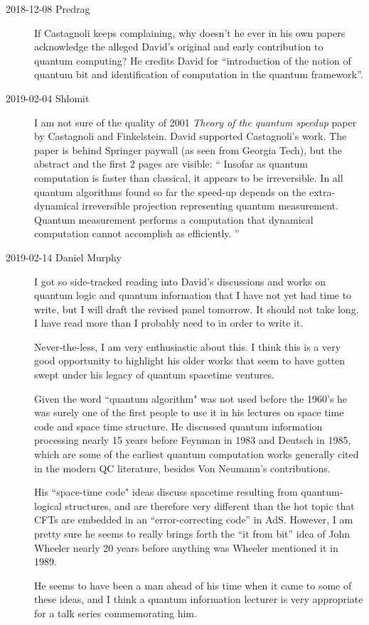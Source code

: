 \begin{description}
\item[2018-12-08 Predrag]
If Castagnoli keeps complaining, why doesn't he ever in his own papers
acknowledge the alleged David's original and early contribution to quantum
computing?
He credits David for ``introduction of the notion of
quantum bit and identification of computation in the quantum
framework''.

\item[2019-02-04 Shlomit]
I am not sure of the quality of 2001 {\em  Theory of the quantum speedup}
paper by Castagnoli and Finkelstein.
David supported Castagnoli's work. %
The paper is behind Springer paywall (as seen from Georgia Tech), but the
abstract and the first 2 pages are visible: ``
Insofar as quantum computation is faster than classical, it appears to be
irreversible. In all quantum algorithms found so far the speed-up depends
on the extra-dynamical irreversible projection representing quantum
measurement. Quantum measurement performs a computation that dynamical
computation cannot accomplish as efficiently.
''

\item[2019-02-14 Daniel Murphy]
I got so side-tracked reading into David's discussions and works on
quantum logic and quantum information that I have not yet had time to
write, but I will draft the revised panel tomorrow. It should not take
long. I have read more than I probably need to in order to write it.

Never-the-less, I am very enthusiastic about this. I think this is a very
good opportunity to highlight his older works that seem to have gotten
swept under his legacy of quantum spacetime ventures.

Given the word ``quantum algorithm" was not used before the 1960's he was
surely one of the first people to use it in his lectures on space time
code and space time structure. He discussed quantum information
processing nearly 15 years before Feynman in 1983 and Deutsch in 1985,
which are some of the earliest quantum computation works generally cited
in the modern QC literature,  besides Von Neumann's contributions.

His ``space-time code" ideas discuss spacetime resulting from
quantum-logical structures, and are therefore very different than the hot
topic that CFTs are embedded in an ``error-correcting code''  in AdS.
However, I am pretty sure he seems to really brings forth the ``it from
bit'' idea of John Wheeler nearly 20 years before anything was Wheeler
mentioned it in 1989.

He seems to have been a man ahead of his time when it came to some of
these ideas, and I think a quantum information lecturer is very
appropriate for a talk series commemorating him.


\end{description}


